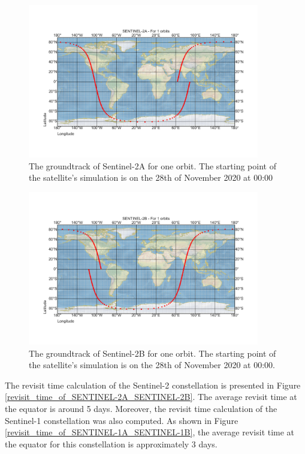 \begin{figure}
\centering
\includegraphics[width=0.9\textwidth]{Images/groundtrack_Sentinel-2A.png}
\caption{The groundtrack of Sentinel-2A for one orbit. The starting point of the satellite's simulation is on the 28th of November 2020 at 00:00}
\label{groundtrack_Sentinel-2A}
\end{figure}

\begin{figure}
\centering
\includegraphics[width=0.9\textwidth]{Images/groundtrack_Sentinel-2B.png}
\caption{The groundtrack of Sentinel-2B for one orbit. The starting point of the satellite's simulation is on the 28th of November 2020 at 00:00.}
\label{groundtrack_Sentinel-2B}
\end{figure}


\bigskip
The revisit time calculation of the Sentinel-2 constellation is presented in Figure \ref{revisit_time_of_SENTINEL-2A_SENTINEL-2B}. The average revisit time at the equator is around 5 days. Moreover, the revisit time calculation of the Sentinel-1 constellation was also computed. As shown in Figure \ref{revisit_time_of_SENTINEL-1A_SENTINEL-1B}, the average revisit time at the equator for this constellation is approximately 3 days.

